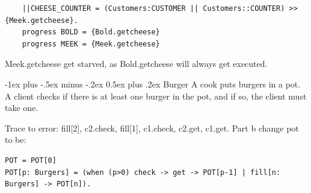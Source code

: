 \documentclass[letterpaper, 8pt]{extarticle}
\makeatletter
\renewcommand{\section}{\@startsection{section}{1}{0mm}%
                                {-1ex plus -.5ex minus -.2ex}%
                                {0.5ex plus .2ex}%
                                {\normalfont\normalsize\bfseries}}
\makeatother
\begin{document}
\begin{multicols*}{5}
  \begin{lstlisting}
    ||CHEESE_COUNTER = (Customers:CUSTOMER || Customers::COUNTER) >> {Meek.getcheese}.
    progress BOLD = {Bold.getcheese}
    progress MEEK = {Meek.getcheese}
    \end{lstlisting}
  Meek.getcheese get starved, as Bold.getcheese will always get executed.

  \section{Burger}
  A cook puts burgers in a pot. A client checks if there is at least one burger in the pot, and if so, the client must take one.

  Trace to error: fill[2], c2.check, fill[1], c1.check, c2.get, c1.get. Part b change pot to be:
  \begin{lstlisting}
POT = POT[0]
POT[p: Burgers] = (when (p>0) check -> get -> POT[p-1] | fill[n: Burgers] -> POT[n]).
\end{lstlisting}

\end{multicols*}
\end{document}
